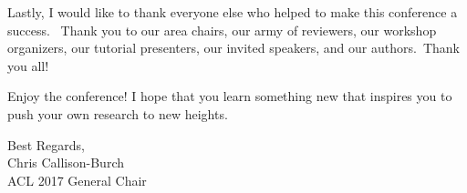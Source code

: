 Lastly, I would like to thank everyone else who helped to make this conference a success.  Thank you to our area chairs, our army of reviewers, our workshop organizers, our tutorial presenters, our invited speakers, and our authors. Thank you all!

Enjoy the conference! I hope that you learn something new that inspires you to
push your own research to new heights.

\vskip 0.5in
\noindent Best Regards,\\
Chris Callison-Burch\\
ACL 2017 General Chair





